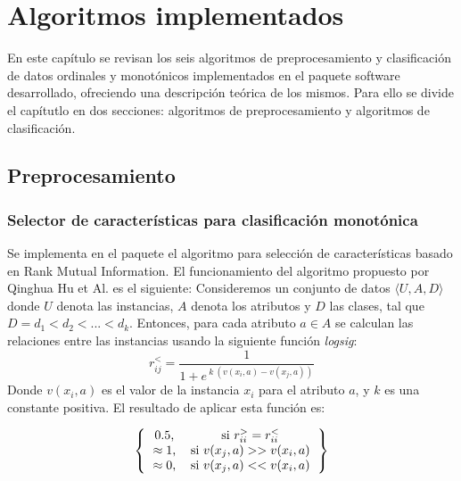 
\chapter{Algoritmos implementados}

En este capítulo se revisan los seis algoritmos de preprocesamiento y clasificación de datos ordinales y monotónicos implementados en el paquete software desarrollado, ofreciendo una descripción teórica de los mismos. Para ello se divide el capítutlo en dos secciones: algoritmos de preprocesamiento y algoritmos de clasificación.
\section{Preprocesamiento}
\subsection{Selector de características para clasificación monotónica}
Se implementa en el paquete el algoritmo para selección de características \cite{hu2012feature} basado en Rank Mutual Information. El funcionamiento del algoritmo propuesto por Qinghua Hu et Al. es el siguiente: \newline
 Consideremos un conjunto de datos $\langle U, A, D \rangle$ donde $U$ denota las instancias, $A$ denota los atributos y $D$ las clases, tal que $D=d_1 < d_2 < ... < d_k$. Entonces, para cada atributo $a \in A$ se calculan las relaciones entre las instancias usando la siguiente función \textit{logsig}: 
 $$r_{ij}^{<}=\frac{1}{1+e^{\ k \ ( v(x_i,a)-v(x_j,a) )}}$$
 Donde $v(x_i,a)$ es el valor de la instancia $x_i$ para el atributo $a$, y $k$ es una constante positiva.
 El resultado de aplicar esta función es:
 
\[ 
\left \{
\begin{tabular}{cc}
0.5, & si $r_{ii}^{>}=r_{ii}^{<}$ \\
$\approx 1$, & si $v(x_j,a) >> v(x_i,a)$  \\
$\approx 0$, & si $v(x_j,a) << v(x_i,a)$ 
\end{tabular}
\right \}
\]

